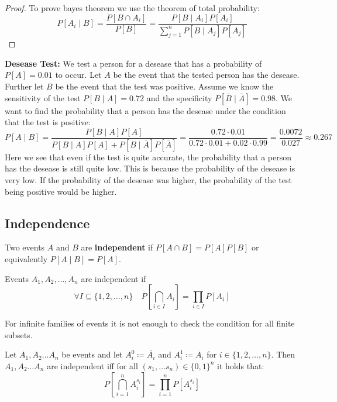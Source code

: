 \begin{proof}
	To prove bayes theorem we use the theorem of total probability:
	$$P[A_i \mid B] = \frac{P[B \cap A_i]}{P[B]} = \frac{P[B \mid A_i] P[A_i]}{\sum_{j=1}^n P[B \mid A_j] P[A_j]}$$
\end{proof}

\begin{example}

	\textbf{Desease Test: }We test a person for a desease that has a probability of $P[A] = 0.01$ to occur.
	Let $A$ be the event that the tested person has the desease. Further let $B$ be the event that the test
	was positive. Assume we know the sensitivity of the test $P[B \mid A] = 0.72$ and the specificity
	$P[\bar{B} \mid \bar{A}] = 0.98$. We want to find the probability that a person has the desease under
	the condition that the test is positive:
	$$P[A \mid B] = \frac{P[B \mid A] P[A]}{P[B \mid A] P[A] + P[B \mid
					\bar{A}] P[\bar{A}]} = \frac{0.72 \cdot 0.01}{0.72 \cdot 0.01 + 0.02 \cdot 0.99} = \frac{0.0072}{0.027}
		\approx 0.267$$
	Here we see that even if the test is quite accurate, the probability that a person has the desease
	is still quite low. This is because the probability of the desease is very low. If the probability of
	the desease was higher, the probability of the test being positive would be higher.

\end{example}

\subsection{Independence}

\begin{definition}
	Two events $A$ and $B$ are \textbf{independent} if $P[A \cap B] = P[A] P[B]$ or equivalently $P[A \mid B] = P[A]$.
\end{definition}

\begin{definition}
	Events $A_1, A_2, \dots, A_n$ are independent if
	$$\forall I \subseteq \{1, 2, \dots, n\}\quad P[\bigcap_{i \in I} A_i] = \prod_{i \in I} P[A_i]$$
\end{definition}

\begin{remark}
	For infinite families of events it is not enough to check the condition for all finite subsets.
\end{remark}

\begin{lemma}
	Let $A_1, A_2 \dots A_n$ be events and let $A_i^{0} \coloneqq \bar{A_i}$ and $A_i^{1} \coloneqq A_i$ for $i \in \{1, 2, \dots, n\}$.
	Then $A_1, A_2 \dots A_n$ are independent iff for all $(s_1, \dots s_n) \in \{0,1\}^{n}$ it holds that:
	$$P[\bigcap_{i=1}^n A_i^{s_i}] = \prod_{i=1}^n P[A_i^{s_i}]$$
\end{lemma}


